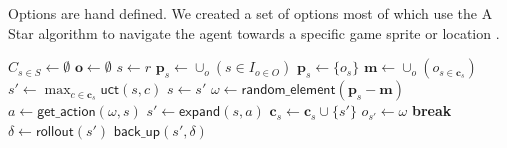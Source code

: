 Options are hand defined. We created a set of options most of which use the A
Star algorithm to navigate the agent towards a specific game sprite or location
\cn.

\begin{algorithm}
	\caption{$\mathsf{O-MCTS}(O, r, t, d)$}
	\label{alg:omcts}
	\begin{algorithmic}[1]
		\State $C_{s \in S} \gets \emptyset$ 
		\State $\mathbf{o} \gets \emptyset$ 
		 \label{alg:omcts:mainloop}
			\State $s \gets r$ 
			 \label{alg:omcts:innerloop}
				 \label{alg:omcts:sp} 
					\State $\mathbf{p}_s \gets \cup_o (s \in I_{o \in O})$ 
				\Else
					\State $\mathbf{p}_s \gets \{o_s\}$ 
				\EndIf \label{alg:omcts:ep}
				\State $\mathbf{m} \gets \cup_o (o_{s \in \mathbf{c}_s})$ 
				 
					\State $s' \gets \max_{c \in \mathbf{c}_s} \mathsf{uct}(s, c)$ \label{alg:omcts:uct} 
					\State $s \gets s'$ \label{alg:omcts:ss} 
				\Else \label{alg:omcts:sexpand}
					\State $\omega \gets \mathsf{random\_element}(\mathbf{p}_s - \mathbf{m})$ 
					\State $a \gets \mathsf{get\_action}(\omega, s)$ 
					\State $s' \gets \mathsf{expand}(s, a)$ 
						\State $\mathbf{c}_s \gets \mathbf{c}_s \cup \{s'\}$ 
					\State $o_{s'} \gets \omega$
					\State \textbf{break} \label{alg:omcts:break}
				\EndIf \label{alg:omcts:eexpand}
			\EndWhile
			\State $\delta \gets \mathsf{rollout}(s')$ \label{alg:omcts:rollout}
			\State $\mathsf{back\_up}(s', \delta)$ \label{alg:omcts:backup}
		\EndWhile
		\State {}
	\end{algorithmic}
\end{algorithm}
